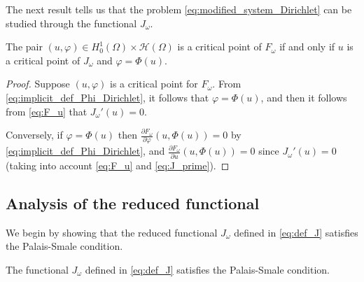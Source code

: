 \documentclass[reqno]{amsart}
\begin{document}
The next result tells us that the problem \eqref{eq:modified_system_Dirichlet} 
can  be studied through the functional $J_\omega$.

\begin{proposition}
 \label{prop:equivalence_F_J_Dirichlet}
The pair $(u, \varphi) \in H_0^1(\Omega) \times \mathcal{H}(\Omega) $ is a critical point of 
$F_\omega$ if and only if $u$ is a critical point of $J_\omega$ and 
$\varphi = \Phi(u)$.
\end{proposition}

\begin{proof}
Suppose $(u, \varphi)$ is a critical point for $F_\omega$. 
From \eqref{eq:implicit_def_Phi_Dirichlet}, it follows that $\varphi = \Phi(u)$, 
and then it follows from \eqref{eq:F_u} that $J_\omega'(u) = 0$.

Conversely, if $\varphi = \Phi(u)$ then 
$\frac{\partial F_\omega}{\partial \varphi}(u, \Phi(u)) = 0$ by 
\eqref{eq:implicit_def_Phi_Dirichlet}, and 
$\frac{\partial F_\omega}{\partial u}(u, \Phi(u)) = 0$ since 
$J_\omega'(u) = 0$ (taking into account \eqref{eq:F_u} and \eqref{eq:J_prime}).
\end{proof}

\subsection{Analysis of the reduced functional}

We begin by showing that the reduced functional $J_\omega$ defined in \eqref{eq:def_J} 
satisfies the Palais-Smale condition.

\begin{lemma}
 \label{lem:PS_condition}
The functional $J_\omega$ defined in \eqref{eq:def_J} satisfies the Palais-Smale 
condition.
\end{lemma}
\end{document}
